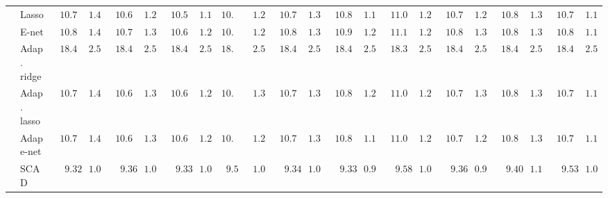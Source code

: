 \begin{tabular}{llllllllllllllllllllll}
	& Lasso  & $\phantom{0}10.723$ & $\phantom{0}1.415$ & $\phantom{0}10.658$ & $\phantom{0}1.279$ & $\phantom{0}10.550$ & $\phantom{0}1.194$ & $10.738$ & $\phantom{0}1.288$ & $\phantom{0}10.722$ & $\phantom{0}1.337$ & $\phantom{0}10.885$ & $\phantom{0}1.191$ & $\phantom{0}11.010$ & $\phantom{0}1.285$ & $\phantom{0}10.751$ & $\phantom{0}1.285$ & $\phantom{0}10.804$ & $\phantom{0}1.368$ & $\phantom{0}10.797$ & $\phantom{0}1.160$ \\
	& E-net  & $\phantom{0}10.811$ & $\phantom{0}1.417$ & $\phantom{0}10.756$ & $\phantom{0}1.341$ & $\phantom{0}10.677$ & $\phantom{0}1.249$ & $10.777$ & $\phantom{0}1.292$ & $\phantom{0}10.800$ & $\phantom{0}1.360$ & $\phantom{0}10.943$ & $\phantom{0}1.209$ & $\phantom{0}11.119$ & $\phantom{0}1.264$ & $\phantom{0}10.848$ & $\phantom{0}1.329$ & $\phantom{0}10.828$ & $\phantom{0}1.326$ & $\phantom{0}10.859$ & $\phantom{0}1.168$ \\
	& Adap. ridge  & $\phantom{0}18.446$ & $\phantom{0}2.545$ & $\phantom{0}18.447$ & $\phantom{0}2.541$ & $\phantom{0}18.465$ & $\phantom{0}2.550$ & $18.464$ & $\phantom{0}2.538$ & $\phantom{0}18.445$ & $\phantom{0}2.545$ & $\phantom{0}18.437$ & $\phantom{0}2.539$ & $\phantom{0}18.360$ & $\phantom{0}2.528$ & $\phantom{0}18.444$ & $\phantom{0}2.546$ & $\phantom{0}18.445$ & $\phantom{0}2.540$ & $\phantom{0}18.456$ & $\phantom{0}2.545$ \\
	& Adap. lasso  & $\phantom{0}10.711$ & $\phantom{0}1.410$ & $\phantom{0}10.618$ & $\phantom{0}1.303$ & $\phantom{0}10.633$ & $\phantom{0}1.271$ & $10.747$ & $\phantom{0}1.300$ & $\phantom{0}10.719$ & $\phantom{0}1.337$ & $\phantom{0}10.869$ & $\phantom{0}1.245$ & $\phantom{0}11.061$ & $\phantom{0}1.287$ & $\phantom{0}10.783$ & $\phantom{0}1.314$ & $\phantom{0}10.810$ & $\phantom{0}1.375$ & $\phantom{0}10.791$ & $\phantom{0}1.157$ \\
	& Adap e-net  & $\phantom{0}10.729$ & $\phantom{0}1.441$ & $\phantom{0}10.657$ & $\phantom{0}1.335$ & $\phantom{0}10.623$ & $\phantom{0}1.226$ & $10.734$ & $\phantom{0}1.290$ & $\phantom{0}10.758$ & $\phantom{0}1.363$ & $\phantom{0}10.860$ & $\phantom{0}1.166$ & $\phantom{0}11.052$ & $\phantom{0}1.266$ & $\phantom{0}10.782$ & $\phantom{0}1.293$ & $\phantom{0}10.818$ & $\phantom{0}1.384$ & $\phantom{0}10.771$ & $\phantom{0}1.146$ \\
	& SCAD  & $\phantom{00}9.326$ & $\phantom{0}1.052$ & $\phantom{00}9.368$ & $\phantom{0}1.056$ & $\phantom{00}9.335$ & $\phantom{0}1.017$ & $\phantom{0}9.534$ & $\phantom{0}1.047$ & $\phantom{00}9.347$ & $\phantom{0}1.018$ & $\phantom{00}9.333$ & $\phantom{0}0.953$ & $\phantom{00}9.583$ & $\phantom{0}1.079$ & $\phantom{00}9.367$ & $\phantom{0}0.987$ & $\phantom{00}9.402$ & $\phantom{0}1.101$ & $\phantom{00}9.537$ & $\phantom{0}1.051$ \\

\end{tabular}
